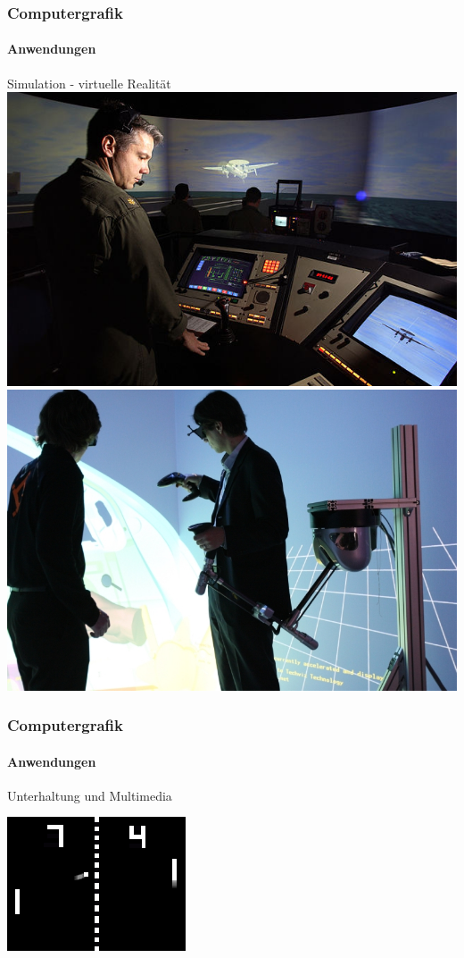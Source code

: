 \documentclass{beamer}
\begin{document}
\begin{frame}
\frametitle{Computergrafik}
\framesubtitle{Anwendungen}
 \begin{block}{Simulation - virtuelle Realität}
\includegraphics[scale=1.0]{images/Flugsimulator}
\includegraphics[scale=0.8]{images/Immersive_Simulation}
\end{block}
\end{frame}



\begin{frame}
\frametitle{Computergrafik}
\framesubtitle{Anwendungen}
 \begin{block}{Unterhaltung und Multimedia}
\begin{center}
\includegraphics[scale=1.0]{images/Pong}
\end{center}
\end{block}
\end{frame}
\end{document}
